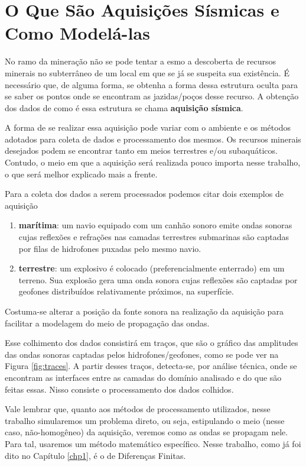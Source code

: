 \section{O Que São Aquisições Sísmicas e Como Modelá-las}

	No ramo da mineração não se pode tentar a esmo a descoberta de recursos
	minerais no subterrâneo de um local em que se já se suspeita sua existência.
	É necessário que, de alguma forma, se obtenha a forma dessa estrutura oculta
	para se saber os pontos onde se encontram as jazidas/poços desse recurso.
	A obtenção dos dados de como é essa estrutura se chama \textbf{aquisição
	sísmica}.

	A forma de se realizar essa aquisição pode variar com o ambiente e os
	métodos adotados para coleta de dados e processamento dos mesmos. Os
	recursos minerais desejados podem se encontrar tanto em meios terrestres
	e/ou subaquáticos. Contudo, o meio em que a aquisição será realizada pouco
	importa nesse trabalho, o que será melhor explicado mais a frente.

	Para a coleta dos dados a serem processados podemos citar dois exemplos
	de aquisição
	\begin{enumerate}
		\item \textbf{marítima}: um navio equipado com um canhão
		sonoro emite ondas sonoras cujas reflexões e refrações nas camadas
		terrestres submarinas são captadas por filas de hidrofones puxadas pelo
		mesmo navio.

		\item \textbf{terrestre}: um explosivo é colocado (preferencialmente
		enterrado) em um terreno. Sua explosão gera uma onda sonora cujas
		reflexões são captadas por geofones distribuídos relativamente próximos,
		na superfície.
	\end{enumerate}
	Costuma-se alterar a posição da fonte sonora na realização da aquisição para
	 facilitar a modelagem do meio de propagação das
	ondas.

	Esse colhimento dos dados consistirá em traços, que são o gráfico das amplitudes
	das ondas sonoras captadas pelos hidrofones/geofones, como se pode ver na Figura 
	\ref{fig:traces}. A partir desses traços, detecta-se, por análise técnica, onde se 
	encontram as interfaces entre as camadas do domínio analisado e do que são feitas 
	essas. Nisso consiste o processamento dos dados colhidos.

	Vale lembrar que, quanto aos métodos de processamento utilizados,  nesse trabalho simularemos um problema
	direto, ou seja, estipulando o meio (nesse caso, não-homogêneo) da aquisição,
	veremos como as ondas se propagam nele. Para tal, usaremos um método
	matemático específico. Nesse trabalho, como já foi dito no Capítulo
	\ref{chp1}, é o de Diferenças Finitas.
